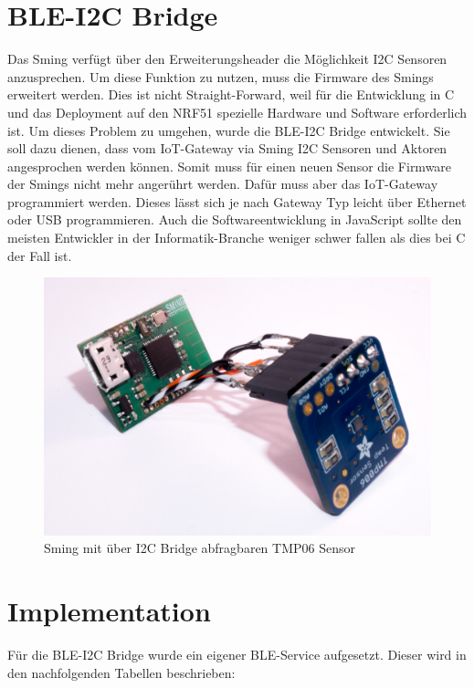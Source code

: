 \clearpage
\section{BLE-I2C Bridge}
\label{bleI2cBridge}

Das Sming verfügt über den Erweiterungsheader die Möglichkeit I2C Sensoren anzusprechen. Um diese Funktion zu nutzen, muss die Firmware des Smings erweitert werden. Dies ist nicht Straight-Forward, weil für die Entwicklung in C und das Deployment auf den NRF51 spezielle Hardware und Software erforderlich ist. Um dieses Problem zu umgehen, wurde die BLE-I2C Bridge entwickelt. Sie soll dazu dienen, dass vom IoT-Gateway via Sming I2C Sensoren und Aktoren angesprochen werden können. Somit muss für einen neuen Sensor die Firmware der Smings nicht mehr angerührt werden. Dafür muss aber das IoT-Gateway programmiert werden. Dieses lässt sich je nach Gateway Typ leicht über Ethernet oder USB programmieren. Auch die Softwareentwicklung in JavaScript sollte den meisten Entwickler in der Informatik-Branche weniger schwer fallen als dies bei C der Fall ist.

\begin{figure}[hbtp]
    \center
    \includegraphics[width=\textwidth]{bilder/foto-2.jpg}
    \caption{Sming mit über I2C Bridge abfragbaren TMP06 Sensor}
    \label{fig:sming_mit_tmp06}
\end{figure}

\clearpage
\section{Implementation}
\label{bleI2cImplementation}

Für die BLE-I2C Bridge wurde ein eigener BLE-Service aufgesetzt. Dieser wird in den nachfolgenden Tabellen beschrieben:

